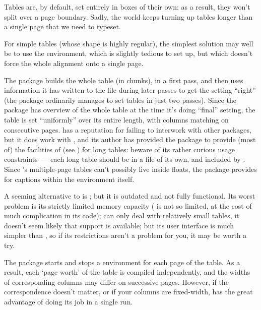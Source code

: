 
Tables are, by default, set entirely in boxes of their own: as a
result, they won't split over a page boundary.  Sadly, the world keeps
turning up tables longer than a single page that we need to typeset.

For simple tables (whose shape is highly regular), the simplest
solution may well be to use the  environment,
which is slightly tedious to set up, but which doesn't force the whole alignment
onto a single page.

The  package builds the whole table (in chunks), in
a first pass, and then uses information it has written to the 
file during later passes to get the setting ``right'' (the package
ordinarily manages to set tables in just two passes).  Since the
package has overview of the whole table at the time it's doing
``final'' setting, the table is set ``uniformly'' over its entire
length, with columns matching on consecutive pages.
 has a reputation for failing to interwork with
other packages, but it does work with , and its
author has provided the  package to provide (most
of) the facilities of  (see
) for long tables:
beware of its rather curious usage constraints~--- each long table
should be in a file of its own, and included by
.  Since 's
multiple-page tables can't possibly live inside floats, the package
provides for captions within the  environment
itself.

A seeming alternative to  is ; but
it is outdated and not fully functional.  Its worst problem is its
strictly limited memory capacity ( is not so
limited, at the cost of much complication in its code);
 can only deal with relatively small tables, it doesn't seem
likely that support is available; but its user interface is much
simpler than , so if its restrictions aren't a
problem for you, it may be worth a try.

The  package starts and stops a
 environment for each page of the table.  As a
result, each `page worth' of the table is compiled independently, and
the widths of corresponding columns may differ on successive pages.
However, if the correspondence doesn't matter, or if your columns are
fixed-width,  has the great advantage of doing
its job in a single run.

